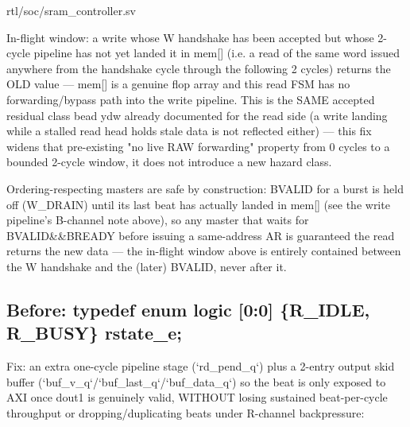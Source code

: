 \begin{relocated}{rtl/soc/sram_controller.sv}
\begin{textblock}
In-flight window: a write whose W handshake has been accepted but
whose 2-cycle pipeline has not yet landed it in mem[] (i.e. a read of
the same word issued anywhere from the handshake cycle through the
following 2 cycles) returns the OLD value — mem[] is a genuine flop
array and this read FSM has no forwarding/bypass path into the write
pipeline. This is the SAME accepted residual class bead ydw already
documented for the read side (a write landing while a stalled read
head holds stale data is not reflected either) — this fix widens that
pre-existing "no live RAW forwarding" property from 0 cycles to a
bounded 2-cycle window, it does not introduce a new hazard class.

Ordering-respecting masters are safe by construction: BVALID for a
burst is held off (W_DRAIN) until its last beat has actually landed
in mem[] (see the write pipeline's B-channel note above), so any
master that waits for BVALID&&BREADY before issuing a same-address AR
is guaranteed the read returns the new data — the in-flight window
above is entirely contained between the W handshake and the (later)
BVALID, never after it.
\end{textblock}

\subsection*{Before: typedef enum logic [0:0] \{R\_IDLE, R\_BUSY\} rstate\_e;}

\begin{textblock}
Fix: an extra one-cycle pipeline stage (`rd_pend_q`) plus a 2-entry
output skid buffer (`buf_v_q`/`buf_last_q`/`buf_data_q`) so the beat
is only exposed to AXI once dout1 is genuinely valid, WITHOUT losing
sustained beat-per-cycle throughput or dropping/duplicating beats
under R-channel backpressure:


\end{textblock}
\end{relocated}
